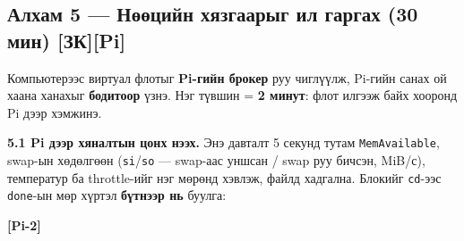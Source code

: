 \hypertarget{ux430ux43bux445ux430ux43c-5-ux43dux4e9ux4e9ux446ux438ux439ux43d-ux445ux44fux437ux433ux430ux430ux440ux44bux433-ux438ux43b-ux433ux430ux440ux433ux430ux445-30-ux43cux438ux43d-ux437ux43api}{%
\subsection{Алхам 5 --- Нөөцийн хязгаарыг ил гаргах (30 мин) {[}ЗК{]}{[}Pi{]}}\label{ux430ux43bux445ux430ux43c-5-ux43dux4e9ux4e9ux446ux438ux439ux43d-ux445ux44fux437ux433ux430ux430ux440ux44bux433-ux438ux43b-ux433ux430ux440ux433ux430ux445-30-ux43cux438ux43d-ux437ux43api}}

Компьютерээс виртуал флотыг \textbf{Pi-гийн брокер} руу чиглүүлж, Pi-гийн санах ой хаана ханахыг \textbf{бодитоор} үзнэ. Нэг түвшин = \textbf{2 минут}: флот илгээж байх хооронд Pi дээр хэмжинэ.

\textbf{5.1 Pi дээр хяналтын цонх нээх.} Энэ давталт 5 секунд тутам \texttt{MemAvailable}, swap-ын хөдөлгөөн (\texttt{si}/\allowbreak\texttt{so} --- swap-аас уншсан / swap руу бичсэн, MiB/с), температур ба throttle-ийг нэг мөрөнд хэвлэж, файлд хадгална. Блокийг \texttt{cd}-ээс \texttt{done}-ын мөр хүртэл \textbf{бүтнээр нь} буулга:

\textbf{{[}Pi-2{]}}

\begin{Shaded}
\begin{Highlighting}[]
 \KeywordTok{;} 
    \VariableTok{$(}\VariableTok{)} \KeywordTok{\textbackslash{}}
    \VariableTok{$(} \VariableTok{)} \KeywordTok{\textbackslash{}}
    \VariableTok{$(}\KeywordTok{|} \KeywordTok{|}  \VariableTok{)} \KeywordTok{\textbackslash{}}
    \VariableTok{$(}\VariableTok{)} \VariableTok{$(}\VariableTok{)}
 \KeywordTok{|} 
\end{Highlighting}
\end{Shaded}

